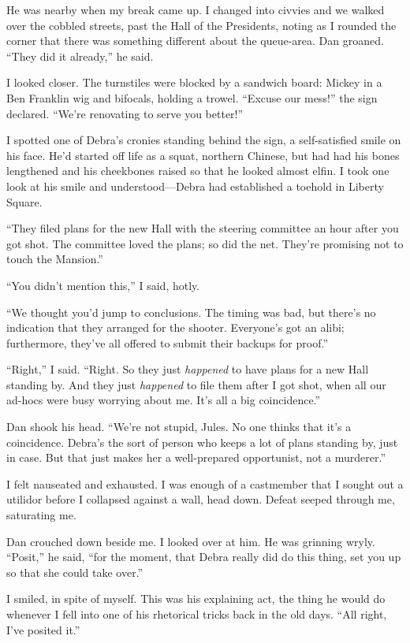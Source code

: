 He was nearby when my break came up. I changed into civvies and we
walked over the cobbled streets, past the Hall of the Presidents,
noting as I rounded the corner that there was something different
about the queue-area. Dan groaned. “They did it already,” he said.

I looked closer. The turnstiles were blocked by a sandwich board:
Mickey in a Ben Franklin wig and bifocals, holding a trowel.
“Excuse our mess!” the sign declared. “We're renovating to serve
you better!”

I spotted one of Debra's cronies standing behind the sign, a
self-satisfied smile on his face. He'd started off life as a squat,
northern Chinese, but had had his bones lengthened and his
cheekbones raised so that he looked almost elfin. I took one look
at his smile and understood—Debra had established a toehold in
Liberty Square.

“They filed plans for the new Hall with the steering committee an
hour after you got shot. The committee loved the plans; so did the
net. They're promising not to touch the Mansion.”

“You didn't mention this,” I said, hotly.

“We thought you'd jump to conclusions. The timing was bad, but
there's no indication that they arranged for the shooter.
Everyone's got an alibi; furthermore, they've all offered to submit
their backups for proof.”

“Right,” I said. “Right. So they just \emph{happened} to have plans
for a new Hall standing by. And they just \emph{happened} to file
them after I got shot, when all our ad-hocs were busy worrying
about me. It's all a big coincidence.”

Dan shook his head. “We're not stupid, Jules. No one thinks that
it's a coincidence. Debra's the sort of person who keeps a lot of
plans standing by, just in case. But that just makes her a
well-prepared opportunist, not a murderer.”

I felt nauseated and exhausted. I was enough of a castmember that I
sought out a utilidor before I collapsed against a wall, head down.
Defeat seeped through me, saturating me.

Dan crouched down beside me. I looked over at him. He was grinning
wryly. “Posit,” he said, “for the moment, that Debra really did do
this thing, set you up so that she could take over.”

I smiled, in spite of myself. This was his explaining act, the
thing he would do whenever I fell into one of his rhetorical tricks
back in the old days. “All right, I've posited it.”

